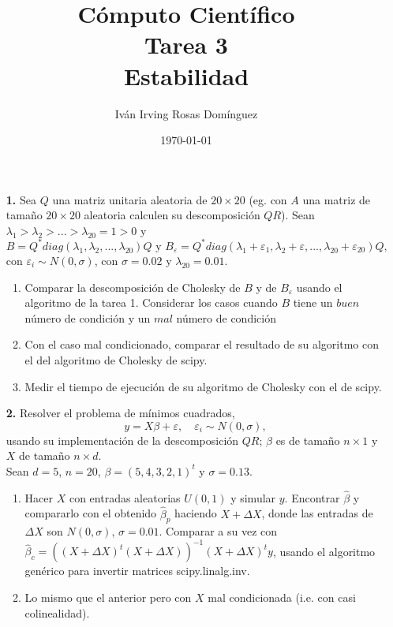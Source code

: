 \documentclass[letterpaper]{article}
\title{\textbf{Cómputo Científico\\
Tarea 3\\   
Estabilidad}}
\author{Iván Irving Rosas Domínguez}
\date{\today}
\newcommand{\1}{\mathds{1}}
\theoremstyle{definition}
\theoremstyle{definition}
\theoremstyle{definition}
\theoremstyle{definition}
\theoremstyle{definition}
\begin{document}
\maketitle


\begin{enumerate}
    \item [\textbf{1.}] Sea $Q$ una matriz unitaria aleatoria de $20\times20$ (eg. con $A$ una matriz
    de tamaño $20\times 20$ aleatoria calculen su descomposición $QR$). Sean $\lambda_1>\lambda_2>...>\lambda_{20}=1>0$
    y 
    \[
    B=Q^*diag(\lambda_1,\lambda_2,...,\lambda_{20})Q \text{ y } B_\varepsilon=Q^*diag(\lambda_1+\varepsilon_1,\lambda_2+\varepsilon,...,\lambda_{20}+\varepsilon_20)Q,
    \]
    con $\varepsilon_i\sim N(0,\sigma)$, con  $\sigma=0.02$ y $\lambda_{20}=0.01$.
    \begin{enumerate}
        \item Comparar la descomposición de Cholesky de $B$ y de $B_\varepsilon$ usando 
        el algoritmo de la tarea 1. Considerar los casos cuando $B$ tiene un 
        $buen$ número de condición y un $mal$ número de condición
        \item Con el caso mal condicionado, comparar el resultado de su algoritmo con el del algoritmo
        de Cholesky de scipy.
        \item Medir el tiempo de ejecución de su algoritmo de Cholesky con el de scipy.
        \end{enumerate}

    \item [\textbf{2.}] Resolver el problema de mínimos cuadrados,
        \[
        y=X\beta+\varepsilon, \quad \varepsilon_i\sim N(0,\sigma),
        \]
        usando su implementación de la descomposición $QR$; $\beta$ es de tamaño $n\times 1$ y $X$ de tamaño
        $n\times d$. \\
        Sean $d=5$, $n=20$, $\beta=(5,4,3,2,1)^t$ y $\sigma=0.13$.
        \begin{enumerate}
            \item Hacer $X$ con entradas aleatorias $U(0,1)$ y simular $y$. Encontrar $\hat{\beta}$ y 
            compararlo con el obtenido $\hat{\beta}_p$ haciendo $X+\Delta X$, donde las entradas de
            $\Delta X$ son $N(0,\sigma)$,  $\sigma=0.01$. Comparar a su vez con $\hat{\beta}_c=\left(\left(X+\Delta X\right)^t\left(X+\Delta X\right)\right)^{-1}(X+\Delta X)^ty$,
            usando el algoritmo genérico para invertir matrices scipy.linalg.inv.
            \item Lo mismo que el anterior pero con $X$ mal condicionada (i.e. con casi colinealidad).
        \end{enumerate}
\end{enumerate}
\end{document}
